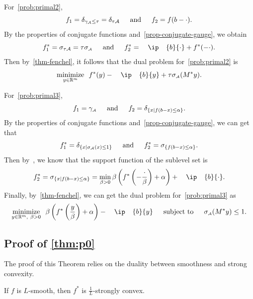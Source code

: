 For~\eqref{prob:primal2},
\[f_1 = \delta_{\gamma_{\scriptscriptstyle\mathcal{A}}\leq\tau} = \delta_{\tau\mathcal{A}} \enspace\hbox{\quad and\quad}\enspace f_2 = f(b - \cdot).
\]
By the properties of conjugate functions and~\autoref{prop-conjugate-gauge}, we obtain 
\[f_1^* = \sigma_{\tau\Ascr} = \tau\sigma\As \enspace\text{and}\enspace f_2^* = \ip{b}{\cdot} + f^*(-\cdot).
\]
Then by~\autoref{thm-fenchel}, it follows that the dual problem for~\eqref{prob:primal2} is 
\[\minimize{y\in\Re^m} f^*(y) - \ip{b}{y} + \tau\sigma\As(M^*y).\]

For~\eqref{prob:primal3},
\[
  f_1 = \gamma_{\scriptscriptstyle\mathcal{A}} \enspace\hbox{\quad and\quad}\enspace f_2 = \delta_{\{x\mid f(b - x)\leq\alpha\}}.
\]
By the properties of conjugate functions and~\autoref{prop-conjugate-gauge}, we can get that 
\[
  f_1^* = \delta_{\{x\mid \sigma_{\scriptscriptstyle\mathcal{A}}(x)\leq1\}} \enspace\hbox{\quad and\quad}\enspace f_2^* = \sigma_{\{f(b - x)\leq\alpha\}}.\]
Then by~\cite[Example~E.2.5.3]{hiriart-urruty01}, we know that the support function of the sublevel set is 
\[f_2^* = \sigma_{\{x\mid f(b - x)\leq\alpha\}} = \min_{\beta > 0} \beta\left(f^*\left(-\frac{\cdot}{\beta}\right) + \alpha\right) + \ip{b}{\cdot}.\]
Finally, by~\autoref{thm-fenchel}, we can get the dual problem for~\eqref{prob:primal3} as
\[\minimize{y\in\Re^m,\ \beta > 0} \beta \left( f^*\left( \frac{y}{\beta} \right) + \alpha \right) - \ip{b}{y} \enspace \text{subject to}\enspace \sigma\As(M^* y) \leq 1.\]


\subsection{Proof of \autoref{thm:p0}} \label{app:main_proof}

The proof of this Theorem relies on the duality between smoothness and strong convexity.
\begin{lemma} \label{lemma:conjugate}
   If $f$ is $L$-smooth, then $f^*$ is $\frac{1}{L}$-strongly convex.
\end{lemma}

